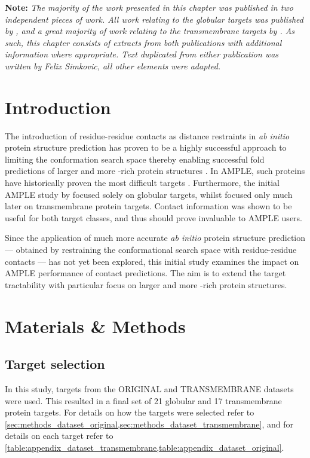 \textbf{Note: }\textit{The majority of the work presented in this chapter was published in two independent pieces of work. All work relating to the globular targets was published by \textcite{Simkovic2016-wk}, and a great majority of work relating to the transmembrane targets by \textcite{Thomas2017-sh}. As such, this chapter consists of extracts from both publications with additional information where appropriate. Text duplicated from either publication was written by Felix Simkovic, all other elements were adapted.}

\section{Introduction}
The introduction of residue-residue contacts as distance restraints in \textit{ab initio} protein structure prediction has proven to be a highly successful approach to limiting the conformation search space thereby enabling successful fold predictions of larger and more \textbeta-rich protein structures \cite[e.g.,][]{Marks2011-os,Michel2014-eg,Kosciolek2014-bt,Ovchinnikov2015-tn,Ovchinnikov2016-jj,Michel2017-xh,De_Oliveira2017-sg,Ovchinnikov2017-nd,Wang2017-rx}. In AMPLE, such proteins have historically proven the most difficult targets \cite{Bibby2012-lm}. Furthermore, the initial AMPLE study by \textcite{Bibby2012-lm} focused solely on globular targets, whilst \textcite{Thomas2017-qu} focused only much later on transmembrane protein targets. Contact information was shown to be useful for both target classes, and thus should prove invaluable to AMPLE users.

Since the application of much more accurate \textit{ab initio} protein structure prediction --- obtained by restraining the conformational search space with residue-residue contacts --- has not yet been explored, this initial study examines the impact on AMPLE performance of contact predictions. The aim is to extend the target tractability with particular focus on larger and more \textbeta-rich protein structures.

\section{Materials \& Methods}
\subsection{Target selection}
In this study, targets from the ORIGINAL and TRANSMEMBRANE datasets were used. This resulted in a final set of 21 globular and 17 transmembrane protein targets. For details on how the targets were selected refer to \cref{sec:methods_dataset_original,sec:methods_dataset_transmembrane}, and for details on each target refer to \cref{table:appendix_dataset_transmembrane,table:appendix_dataset_original}.

